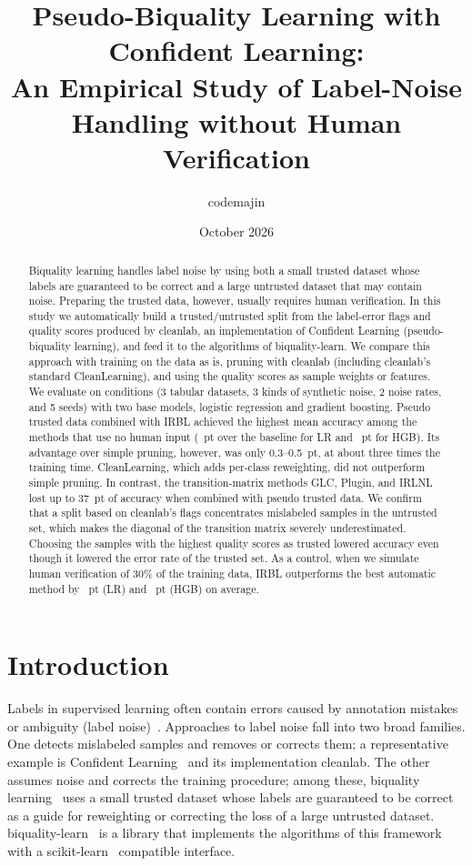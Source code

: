 \documentclass[a4paper,10pt]{article}
\title{Pseudo-Biquality Learning with Confident Learning:\\An Empirical Study of Label-Noise Handling without Human Verification}
\author{codemajin}
\date{October 2026}
\newcommand{\cl}{\textsf{cleanlab}}
\newcommand{\bq}{\textsf{biquality-learn}}
\begin{document}
\maketitle

\begin{abstract}
Biquality learning handles label noise by using both a small trusted dataset whose labels are guaranteed to be correct and a large untrusted dataset that may contain noise.
Preparing the trusted data, however, usually requires human verification.
In this study we automatically build a trusted/untrusted split from the label-error flags and quality scores produced by \cl{}, an implementation of Confident Learning (pseudo-biquality learning), and feed it to the algorithms of \bq{}.
We compare this approach with training on the data as is, pruning with \cl{} (including \cl{}'s standard CleanLearning), and using the quality scores as sample weights or features.
We evaluate on \NCond{} conditions (3 tabular datasets, 3 kinds of synthetic noise, 2 noise rates, and 5 seeds) with two base models, logistic regression and gradient boosting.
Pseudo trusted data combined with IRBL achieved the highest mean accuracy among the methods that use no human input (\DLRNaiveIRBL{}~pt over the baseline for LR and \DHGBNaiveIRBL{}~pt for HGB).
Its advantage over simple pruning, however, was only 0.3--0.5~pt, at about three times the training time.
CleanLearning, which adds per-class reweighting, did not outperform simple pruning.
In contrast, the transition-matrix methods GLC, Plugin, and IRLNL lost up to 37~pt of accuracy when combined with pseudo trusted data.
We confirm that a split based on \cl{}'s flags concentrates mislabeled samples in the untrusted set, which makes the diagonal of the transition matrix severely underestimated.
Choosing the samples with the highest quality scores as trusted lowered accuracy even though it lowered the error rate of the trusted set.
As a control, when we simulate human verification of 30\% of the training data, IRBL outperforms the best automatic method by \PLROracleThirtyVsNaiveIrbl{}~pt (LR) and \PHGBOracleThirtyVsNaiveIrbl{}~pt (HGB) on average.
\end{abstract}

\section{Introduction}

Labels in supervised learning often contain errors caused by annotation mistakes or ambiguity (label noise)~\cite{frenay2014survey,song2023survey}.
Approaches to label noise fall into two broad families.
One detects mislabeled samples and removes or corrects them; a representative example is Confident Learning~\cite{northcutt2021confident} and its implementation \cl{}.
The other assumes noise and corrects the training procedure; among these, biquality learning~\cite{nodet2023framework} uses a small trusted dataset whose labels are guaranteed to be correct as a guide for reweighting or correcting the loss of a large untrusted dataset.
\bq{}~\cite{nodet2023bqlearn} is a library that implements the algorithms of this framework with a scikit-learn~\cite{pedregosa2011sklearn} compatible interface.
\end{document}
